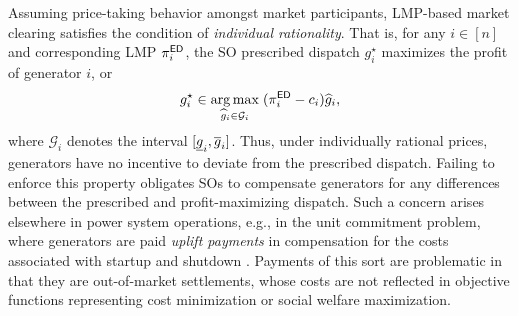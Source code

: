 Assuming price-taking behavior amongst market participants, LMP-based market clearing satisfies the condition of \emph{individual rationality}. That is, for any $i\in[n]$ and corresponding LMP $\pi^{{\sf ED}}_i$, the SO prescribed dispatch $g^\star_i$ maximizes the profit of generator $i$, or
\begin{equation}\nonumber
    g_i^\star \in \underset{\widehat{g}_i \in \mathcal{G}_i}{\arg\max} \; (\pi^{{\sf ED}}_i - c_i) \widehat{g}_i,
\end{equation}
where $\mathcal{G}_i$ denotes the interval $[\underline{{g}}_i,\overline{{g}}_i]$. Thus, under individually rational prices, generators have no incentive to deviate from the prescribed dispatch. Failing to enforce this property obligates SOs to compensate generators for any differences between the prescribed and profit-maximizing dispatch. Such a concern arises elsewhere in power system operations, e.g., in the unit commitment problem, where generators are paid \emph{uplift payments} in compensation for the costs associated with startup and shutdown \cite{yang2019unified}. Payments of this sort are problematic in that they are out-of-market settlements, whose costs are not reflected in objective functions representing cost minimization or social welfare maximization.